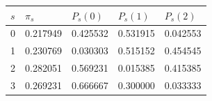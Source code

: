 \begin{tabular}{lllll}
\toprule
$s$ & $\pi_s$ & $P_s(0)$ & $P_s(1)$ & $P_s(2)$ \\
\midrule
0 & 0.217949 & 0.425532 & 0.531915 & 0.042553 \\
1 & 0.230769 & 0.030303 & 0.515152 & 0.454545 \\
2 & 0.282051 & 0.569231 & 0.015385 & 0.415385 \\
3 & 0.269231 & 0.666667 & 0.300000 & 0.033333 \\
\bottomrule
\end{tabular}
